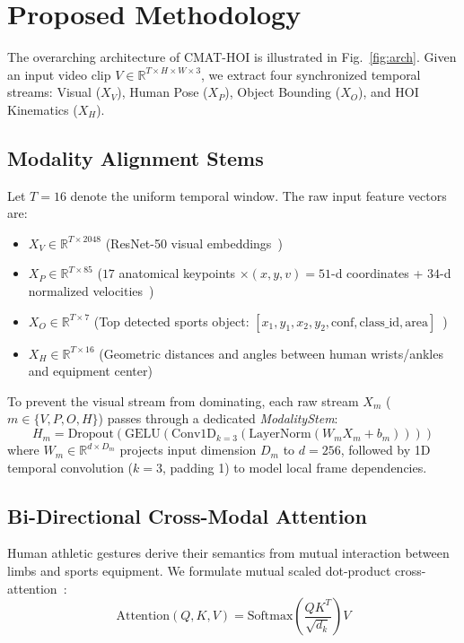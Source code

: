 \documentclass[10pt,journal,compsoc]{IEEEtran}
\begin{document}
\section{Proposed Methodology}

The overarching architecture of CMAT-HOI is illustrated in Fig.~\ref{fig:arch}. Given an input video clip $V \in \mathbb{R}^{T \times H \times W \times 3}$, we extract four synchronized temporal streams: Visual ($X_V$), Human Pose ($X_P$), Object Bounding ($X_O$), and HOI Kinematics ($X_H$).

\subsection{Modality Alignment Stems}
Let $T=16$ denote the uniform temporal window. The raw input feature vectors are:
\begin{itemize}
    \item $X_V \in \mathbb{R}^{T \times 2048}$ (ResNet-50 visual embeddings~\cite{he2016deep})
    \item $X_P \in \mathbb{R}^{T \times 85}$ ($17$ anatomical keypoints $\times (x, y, v) = 51$-d coordinates + $34$-d normalized velocities~\cite{he2017mask})
    \item $X_O \in \mathbb{R}^{T \times 7}$ (Top detected sports object: $[x_1, y_1, x_2, y_2, \text{conf}, \text{class\_id}, \text{area}]$~\cite{ren2015faster})
    \item $X_H \in \mathbb{R}^{T \times 16}$ (Geometric distances and angles between human wrists/ankles and equipment center)
\end{itemize}

To prevent the visual stream from dominating, each raw stream $X_m$ ($m \in \{V, P, O, H\}$) passes through a dedicated \textit{ModalityStem}:
\begin{equation}
H_m = \text{Dropout}\left(\text{GELU}\left(\text{Conv1D}_{k=3}\left(\text{LayerNorm}(W_m X_m + b_m)\right)\right)\right)
\end{equation}
where $W_m \in \mathbb{R}^{d \times D_m}$ projects input dimension $D_m$ to $d = 256$, followed by 1D temporal convolution ($k=3$, padding 1) to model local frame dependencies.

\subsection{Bi-Directional Cross-Modal Attention}
Human athletic gestures derive their semantics from mutual interaction between limbs and sports equipment. We formulate mutual scaled dot-product cross-attention~\cite{vaswani2017attention}:
\begin{equation}
\text{Attention}(Q, K, V) = \text{Softmax}\left(\frac{Q K^T}{\sqrt{d_k}}\right) V
\end{equation}
\end{document}
